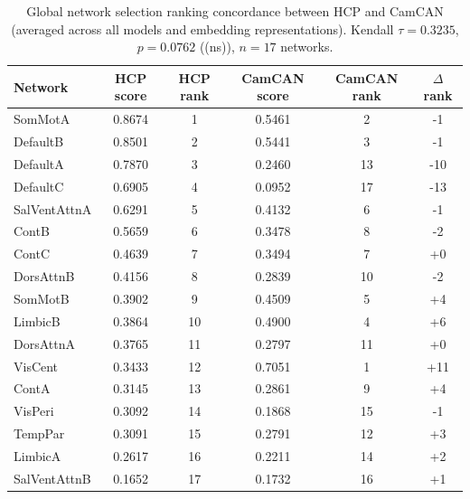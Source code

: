 \begin{table}[ht]
\caption{Global network selection ranking concordance between HCP and CamCAN (averaged across all models and embedding representations). Kendall $\tau = 0.3235$, $p = 0.0762$ ((ns)), $n = 17$ networks.}
\label{tab:global_kendall}
\begin{tabular}{lccccc}
\toprule
Network & HCP score & HCP rank & CamCAN score & CamCAN rank & $\Delta$ rank \\
\midrule
SomMotA & 0.8674 & 1 & 0.5461 & 2 & -1 \\
DefaultB & 0.8501 & 2 & 0.5441 & 3 & -1 \\
DefaultA & 0.7870 & 3 & 0.2460 & 13 & -10 \\
DefaultC & 0.6905 & 4 & 0.0952 & 17 & -13 \\
SalVentAttnA & 0.6291 & 5 & 0.4132 & 6 & -1 \\
ContB & 0.5659 & 6 & 0.3478 & 8 & -2 \\
ContC & 0.4639 & 7 & 0.3494 & 7 & +0 \\
DorsAttnB & 0.4156 & 8 & 0.2839 & 10 & -2 \\
SomMotB & 0.3902 & 9 & 0.4509 & 5 & +4 \\
LimbicB & 0.3864 & 10 & 0.4900 & 4 & +6 \\
DorsAttnA & 0.3765 & 11 & 0.2797 & 11 & +0 \\
VisCent & 0.3433 & 12 & 0.7051 & 1 & +11 \\
ContA & 0.3145 & 13 & 0.2861 & 9 & +4 \\
VisPeri & 0.3092 & 14 & 0.1868 & 15 & -1 \\
TempPar & 0.3091 & 15 & 0.2791 & 12 & +3 \\
LimbicA & 0.2617 & 16 & 0.2211 & 14 & +2 \\
SalVentAttnB & 0.1652 & 17 & 0.1732 & 16 & +1 \\
\bottomrule
\end{tabular}
\end{table}

